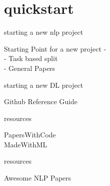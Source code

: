 \documentclass[10pt]{beamer}
\begin{document}
\section[Quickstart]{quickstart}

\begin{frame}[fragile]{starting a new nlp project}

	Starting Point for a new project -\\
	- Task based split\\
	- General Papers\\

\end{frame}

\begin{frame}[fragile]{starting a new DL project}

	Github Reference Guide

\end{frame}

\begin{frame}[fragile]{resources}

	PapersWithCode\\
	MadeWithML

\end{frame}

\begin{frame}[fragile]{resources}

	Awesome NLP Papers

\end{frame}
\end{document}
